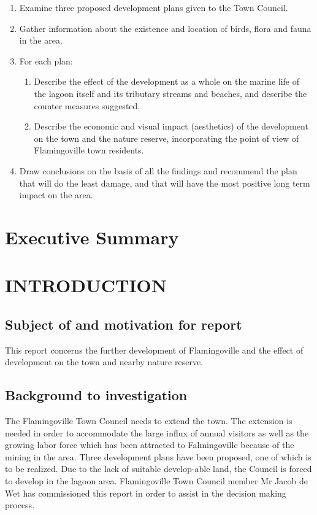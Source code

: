 \documentclass{article}
\begin{document}
\begin{enumerate}
	\item Examine three proposed development plans given to the Town Council.
	\item Gather information about the existence and location of birds, flora and fauna in the area.
	\item For each plan:
	\begin{enumerate}
		\item Describe the effect of the development as a whole on the marine life of the lagoon itself and its tributary streams and beaches, and describe the counter measures suggested.
		\item Describe the economic and visual impact (aesthetics) of the development on the town and the nature reserve, incorporating the point of view of Flamingoville town residents.
	\end{enumerate}
	\item Draw conclusions on the basis of all the findings and recommend the plan that will do the least damage, and that will have the most positive long term impact on the area.
\end{enumerate}

\newpage
\section*{Executive Summary}

\newpage
\tableofcontents

\setcounter{page}{0}

\newpage
\section{INTRODUCTION}
\subsection{Subject of and motivation for report}
This report concerns the further development of Flamingoville and the effect of development on the town and nearby nature reserve.

\subsection{Background to investigation}
The Flamingoville Town Council needs to extend the town. The extension is needed in order to accommodate the large influx of annual visitors as well as the growing labor force which has been attracted to Falmingoville because of the mining in the area. Three development plans have been proposed, one of which is to be realized. Due to the lack of suitable develop-able land, the Council is forced to develop in the lagoon area. Flamingoville Town Council member Mr Jacob de Wet has commissioned this report in order to assist in the decision making process.
\end{document}
